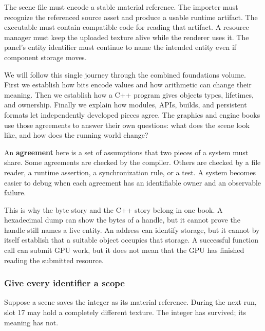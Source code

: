 The scene file must encode a stable material reference. The importer must recognize the referenced source asset and produce a usable runtime artifact. The executable must contain compatible code for reading that artifact. A resource manager must keep the uploaded texture alive while the renderer uses it. The panel's entity identifier must continue to name the intended entity even if component storage moves.

We will follow this single journey through the combined foundations volume. First we establish how bits encode values and how arithmetic can change their meaning. Then we establish how a C++ program gives objects types, lifetimes, and ownership. Finally we explain how modules, APIs, builds, and persistent formats let independently developed pieces agree. The graphics and engine books use those agreements to answer their own questions: what does the scene look like, and how does the running world change?

An \textbf{agreement} here is a set of assumptions that two pieces of a system must share. Some agreements are checked by the compiler. Others are checked by a file reader, a runtime assertion, a synchronization rule, or a test. A system becomes easier to debug when each agreement has an identifiable owner and an observable failure.


This is why the byte story and the C++ story belong in one book. A hexadecimal dump can show the bytes of a handle, but it cannot prove the handle still names a live entity. An address can identify storage, but it cannot by itself establish that a suitable object occupies that storage. A successful function call can submit GPU work, but it does not mean that the GPU has finished reading the submitted resource.

\subsubsection{Give every identifier a scope}\label{01-foundations-i-ch001-give-every-identifier-a-scope}

\hypertarget{01-foundations-i-ch001-give-every-identifier-a-scope}{}

Suppose a scene saves the integer  as its material reference. During the next run, slot 17 may hold a completely different texture. The integer has survived; its meaning has not.

